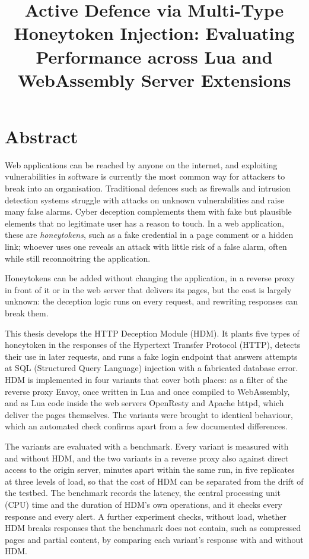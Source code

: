 \documentclass{rptuma}
\title{Active Defence via Multi-Type Honeytoken Injection: Evaluating Performance across Lua and WebAssembly Server Extensions}
\begin{document}
\maketitle
\makedeclaration

\setcounter{page}{1}

\chapter*{Abstract}
Web applications can be reached by anyone on the internet, and exploiting vulnerabilities in
software is currently the most common way for attackers to break into an organisation. Traditional
defences such as firewalls and intrusion detection systems struggle with attacks on unknown
vulnerabilities and raise many false alarms. Cyber deception complements them with fake but
plausible elements that no legitimate user has a reason to touch. In a web application, these are
\emph{honeytokens}, such as a fake credential in a page comment or a hidden link; whoever uses one
reveals an attack with little risk of a false alarm, often while still reconnoitring the
application.

Honeytokens can be added without changing the application, in a reverse proxy in front of it or in
the web server that delivers its pages, but the cost is largely unknown: the deception logic runs on
every request, and rewriting responses can break them.

This thesis develops the HTTP Deception Module (HDM). It plants five types of honeytoken in the
responses of the Hypertext Transfer Protocol (HTTP), detects their use in later requests, and runs
a fake login endpoint that answers attempts at SQL (Structured Query Language) injection with a
fabricated database error. HDM is implemented in four variants that cover both places: as a filter
of the reverse proxy Envoy, once written in Lua and once compiled to WebAssembly, and as Lua code
inside the web servers OpenResty and Apache httpd, which deliver the pages themselves. The variants
were brought to identical behaviour, which an automated check confirms apart from a few documented
differences.

The variants are evaluated with a benchmark. Every variant is measured with and without HDM,
and the two variants in a reverse proxy also against direct access to the origin server, minutes
apart within the same run, in five
replicates at three levels of load, so that the cost of HDM can be separated from the drift of the
testbed. The benchmark records the latency, the central processing unit (CPU) time and the duration
of HDM's own operations, and it checks every response and every alert. A further experiment
checks, without load, whether HDM breaks responses that the benchmark does not contain, such as
compressed pages and partial content, by comparing each variant's response with and without HDM.
\end{document}
